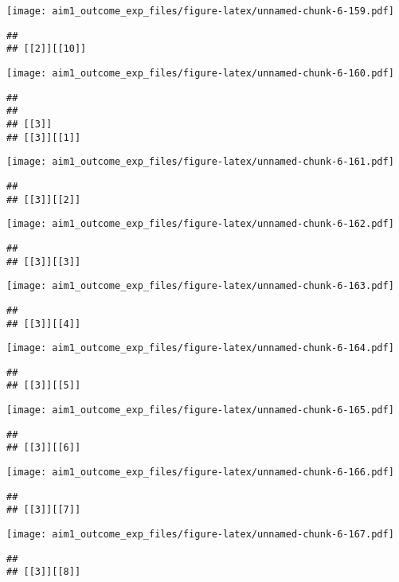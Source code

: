 \documentclass[
]{article}
\begin{document}
\texttt{[image: aim1\_outcome\_exp\_files/figure-latex/unnamed-chunk-6-159.pdf]}

\begin{verbatim}
## 
## [[2]][[10]]
\end{verbatim}

\texttt{[image: aim1\_outcome\_exp\_files/figure-latex/unnamed-chunk-6-160.pdf]}

\begin{verbatim}
## 
## 
## [[3]]
## [[3]][[1]]
\end{verbatim}

\texttt{[image: aim1\_outcome\_exp\_files/figure-latex/unnamed-chunk-6-161.pdf]}

\begin{verbatim}
## 
## [[3]][[2]]
\end{verbatim}

\texttt{[image: aim1\_outcome\_exp\_files/figure-latex/unnamed-chunk-6-162.pdf]}

\begin{verbatim}
## 
## [[3]][[3]]
\end{verbatim}

\texttt{[image: aim1\_outcome\_exp\_files/figure-latex/unnamed-chunk-6-163.pdf]}

\begin{verbatim}
## 
## [[3]][[4]]
\end{verbatim}

\texttt{[image: aim1\_outcome\_exp\_files/figure-latex/unnamed-chunk-6-164.pdf]}

\begin{verbatim}
## 
## [[3]][[5]]
\end{verbatim}

\texttt{[image: aim1\_outcome\_exp\_files/figure-latex/unnamed-chunk-6-165.pdf]}

\begin{verbatim}
## 
## [[3]][[6]]
\end{verbatim}

\texttt{[image: aim1\_outcome\_exp\_files/figure-latex/unnamed-chunk-6-166.pdf]}

\begin{verbatim}
## 
## [[3]][[7]]
\end{verbatim}

\texttt{[image: aim1\_outcome\_exp\_files/figure-latex/unnamed-chunk-6-167.pdf]}

\begin{verbatim}
## 
## [[3]][[8]]
\end{verbatim}
\end{document}
